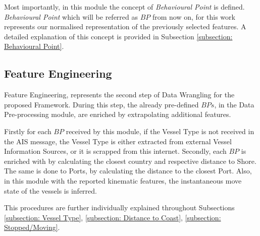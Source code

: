 Most importantly, in this module the concept of \emph{Behavioural Point} is defined. \emph{Behavioural Point} which will be referred as $BP$ from now on, for this work represents our normalised representation of the previously selected features. A detailed explanation of this concept is provided in Subsection \ref{subsection: Behavioural Point}.

\subsection{Feature Engineering}
\label{subsection: 3 Feature Engineering}
Feature Engineering, represents the second step of Data Wrangling for the proposed Framework. During this step, the already pre-defined $BPs$, in the Data Pre-processing module, are enriched by extrapolating additional features. 

Firstly for each $BP$ received by this module, if the Vessel Type is not received in the AIS message, the Vessel Type is either extracted from external Vessel Information Sources, or it is scrapped from this internet.
Secondly, each $BP$ is enriched with by calculating the closest country and respective distance to Shore. The same is done to Ports, by calculating the distance to the closest Port. Also, in this module with the reported kinematic features, the instantaneous move state of the vessels is inferred.

This procedures are further individually explained throughout Subsections \ref{subsection: Vessel Type}, \ref{subsection: Distance to Coast}, \ref{subsection: Stopped/Moving}.






